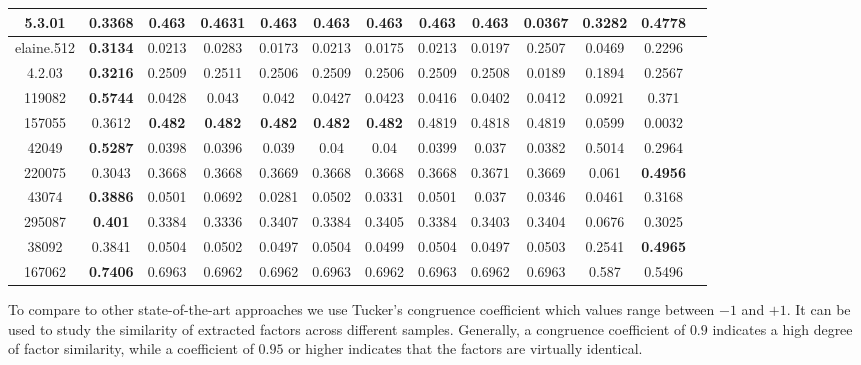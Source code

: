 \begin{table}[t]
\begin{center}
\begin{small}
\begin{sc}
{\begin{tabular}{ c c c c c c c c c  c  c  c  c }
5.3.01 & 0.3368  &  0.463  &  0.4631  &  0.463  &  0.463  &  0.463  &  0.463  &  0.463  &  0.0367  &  0.3282  &  \bf 0.4778  &   \\ \hline
elaine.512 &  \bf 0.3134  &  0.0213  &  0.0283  &  0.0173  &  0.0213  &  0.0175  &  0.0213  &  0.0197  &  0.2507  &  0.0469  &  0.2296  &   \\
4.2.03 &  \bf 0.3216  &  0.2509  &  0.2511  &  0.2506  &  0.2509  &  0.2506  &  0.2509  &  0.2508  &  0.0189  &  0.1894  &  0.2567  &   \\ \hline
119082 &  \bf 0.5744  &  0.0428  &  0.043  &  0.042  &  0.0427  &  0.0423  &  0.0416  &  0.0402  &  0.0412  &  0.0921  &  0.371  &   \\
157055 & 0.3612  &  \bf  0.482  &  \bf 0.482  &  \bf 0.482  &  \bf 0.482  &  \bf 0.482  &  0.4819  &  0.4818  &  0.4819  &  0.0599  &  0.0032  &   \\ \hline
42049 &  \bf 0.5287  &  0.0398  &  0.0396  &  0.039  &  0.04  &  0.04  &  0.0399  &  0.037  &  0.0382  &  0.5014  &  0.2964  &   \\
220075 & 0.3043  &  0.3668  &  0.3668  &  0.3669  &  0.3668  &  0.3668  &  0.3668  &  0.3671  &  0.3669  &  0.061  &  \bf 0.4956  &   \\ \hline
43074 &  \bf 0.3886  &  0.0501  &  0.0692  &  0.0281  &  0.0502  &  0.0331  &  0.0501  &  0.037  &  0.0346  &  0.0461  &  0.3168  &   \\
295087 &  \bf 0.401  &  0.3384  &  0.3336  &  0.3407  &  0.3384  &  0.3405  &  0.3384  &  0.3403  &  0.3404  &  0.0676  &  0.3025  &   \\ \hline
38092 & 0.3841  &  0.0504  &  0.0502  &  0.0497  &  0.0504  &  0.0499  &  0.0504  &  0.0497  &  0.0503  &  0.2541  &   \bf  0.4965  &   \\
167062 &  \bf  0.7406  &  0.6963  &  0.6962  &  0.6962  &  0.6963  &  0.6962  &  0.6963  &  0.6962  &  0.6963  &  0.587  &  0.5496  &   \\ \hline
\hline
\end{tabular}
}
\end{sc}
\end{small}
\end{center}
\vskip -0.1in
\end{table}




To compare \ICA{} to other state-of-the-art approaches we use 
Tucker's congruence coefficient \cite{lorenzo2006tucker} which values range between $-1$ and $+1$. It can be used to study the similarity of extracted factors across different samples. Generally, a congruence coefficient of $0.9$ indicates a high degree of factor similarity, while a coefficient of $0.95$ or higher indicates that the factors are virtually identical. 

